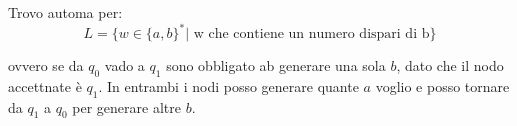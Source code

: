 \begin{esempio}
Trovo automa per: $$L=\{w\in\{a,b\}^*|\mbox{ w che contiene un numero dispari di b}\}$$
\begin{center}
\end{center}
ovvero se da $q_0$ vado a $q_1$ sono obbligato ab generare una sola $b$, dato che il nodo accettnate è $q_1$. In entrambi i nodi posso generare quante $a$ voglio e posso tornare da $q_1$ a $q_0$ per generare altre $b$.
\end{esempio}
